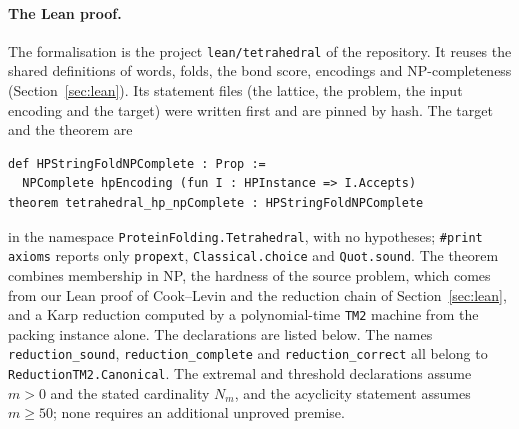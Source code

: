 \documentclass[11pt,letterpaper]{article}
\theoremstyle{definition}
\theoremstyle{remark}
\newcommand{\lean}[1]{\texttt{#1}}
\newcommand{\tetrapath}{lean/tetrahedral}
\begin{document}
\paragraph{The Lean proof.}
The formalisation is the project \lean{\tetrapath} of the repository. It reuses the
shared definitions of words, folds, the bond score, encodings and NP-completeness
(Section~\ref{sec:lean}). Its statement files (the lattice, the problem, the input encoding and the
target) were written first and are pinned by hash. The target and the theorem are
{\small
\begin{verbatim}
def HPStringFoldNPComplete : Prop :=
  NPComplete hpEncoding (fun I : HPInstance => I.Accepts)
theorem tetrahedral_hp_npComplete : HPStringFoldNPComplete
\end{verbatim}
}
\noindent in the namespace \lean{ProteinFolding.Tetrahedral}, with no hypotheses; \lean{\#print axioms}
reports only \lean{propext}, \lean{Classical.choice} and \lean{Quot.sound}. The theorem combines
membership in NP, the hardness of the source problem, which comes from our Lean proof of
Cook--Levin and the reduction chain of Section~\ref{sec:lean}, and a Karp reduction computed by a
polynomial-time \lean{TM2} machine from the packing instance alone. The declarations are listed
below. The names \lean{reduction\_sound}, \lean{reduction\_complete} and \lean{reduction\_correct}
all belong to \lean{ReductionTM2.Canonical}. The extremal and threshold declarations assume $m>0$
and the stated cardinality $N_m$, and the acyclicity statement assumes $m\ge50$; none requires an
additional unproved premise.
\end{document}
